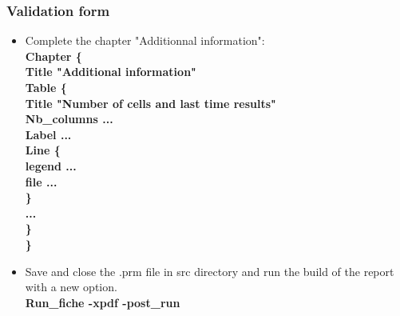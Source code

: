 \documentclass[10pt]{beamer}
\begin{document}
\begin{frame}
\frametitle{Validation form}
\begin{block}{}

\begin{itemize}
\item Complete the chapter "Additionnal information":\\
{\footnotesize{
\textbf{Chapter \{ } \\
\hspace{0.3cm} \textbf{Title "Additional information"} \\
\hspace{0.3cm} \textbf{Table \{} \\
\hspace{0.6cm} \textbf{Title "Number of cells and last time results"} \\
\hspace{0.6cm} \textbf{Nb\_columns ...} \\
\hspace{0.6cm} \textbf{Label ...} \\
\hspace{0.6cm} \textbf{Line \{} \\
\hspace{0.9cm} \textbf{legend ...} \\
\hspace{0.9cm} \textbf{file ...} \\
\hspace{0.6cm} \textbf{\}} \\
\hspace{0.3cm} \textbf{...} \\
\hspace{0.3cm} \textbf{\}} \\
\textbf{\}} \\
}}

\item Save and close the .prm file in src directory and run the build of the report with a new option.\\
\textbf{Run\_fiche -xpdf -post\_run}

\end{itemize}

\end{block}
\end{frame}
\end{document}
